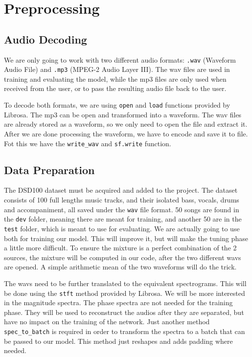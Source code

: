 \documentclass[../Thesis.tex]{subfiles}
\begin{document}
 
\section  {Preprocessing}
\subsection {Audio Decoding}

We are only going to work with two different audio formats: \texttt{.wav} (Waveform Audio File) and \texttt{.mp3} (MPEG-2 Audio Layer III). The wav files are used in training and evaluating the model, while the mp3 files are only used when received from the user, or to pass the resulting audio file back to the user.

To decode both formats, we are using \texttt{open} and \texttt{load} functions provided by Librosa. The mp3 can be open and transformed into a waveform. The wav files are already stored as a waveform, so we only need to open the file and extract it. After we are done processing the waveform, we have to encode and save it to file. Fot this we have the \texttt{write\_wav} and \texttt{sf.write} function.


\subsection {Data Preparation}

The DSD100 dataset must be acquired and added to the project. The dataset consists of 100 full lengths music tracks, and their isolated bass, vocals, drums and accompaniment, all saved under the \texttt{wav} file format. 50 songs are found in the \texttt{dev} folder, meaning there are meant for training, and another 50 are in the \texttt{test} folder, which is meant to use for evaluating. We are actually going to use both for training our model. This will improve it, but will make the tuning phase a little more difficult. To ensure the mixture is a perfect combination of the 2 sources, the mixture will be computed in our code, after the two different wavs are opened. A simple arithmetic mean of the two waveforms will do the trick.

The wavs need to be further translated to the equivalent spectrograms. This will be done using the \texttt{stft} method provided by Librosa. We will be more interested in the magnitude spectra. The phase spectra are not needed for the training phase. They will be used to reconstruct the audios after they are separated, but have no impact on the training of the network. Just another method \texttt{spec\_to\_batch} is required in order to transform the spectra to a batch that can be passed to our model. This method just reshapes and adds padding where needed.
\end{document}
